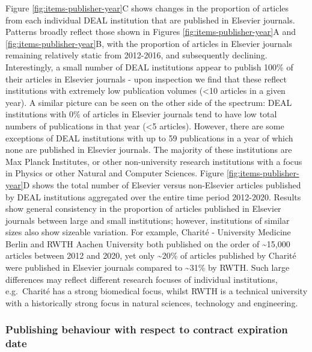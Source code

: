 \documentclass[
]{article}
\begin{document}
Figure \ref{fig:items-publisher-year}C shows changes in the proportion of articles from each individual DEAL institution that are published in Elsevier journals. Patterns broadly reflect those shown in Figures \ref{fig:items-publisher-year}A and \ref{fig:items-publisher-year}B, with the proportion of articles in Elsevier journals remaining relatively static from 2012-2016, and subsequently declining. Interestingly, a small number of DEAL institutions appear to publish 100\% of their articles in Elsevier journals - upon inspection we find that these reflect institutions with extremely low publication volumes (\textless10 articles in a given year). A similar picture can be seen on the other side of the spectrum: DEAL institutions with 0\% of articles in Elsevier journals tend to have low total numbers of publications in that year (\textless5 articles). However, there are some exceptions of DEAL institutions with up to 59 publications in a year of which none are published in Elsevier journals. The majority of these institutions are Max Planck Institutes, or other non-university research institutions with a focus in Physics or other Natural and Computer Sciences. Figure \ref{fig:items-publisher-year}D shows the total number of Elsevier versus non-Elsevier articles published by DEAL institutions aggregated over the entire time period 2012-2020. Results show general consistency in the proportion of articles published in Elsevier journals between large and small institutions; however, institutions of similar sizes also show sizeable variation. For example, Charité - University Medicine Berlin and RWTH Aachen University both published on the order of \textasciitilde15,000 articles between 2012 and 2020, yet only \textasciitilde20\% of articles published by Charité were published in Elsevier journals compared to \textasciitilde31\% by RWTH. Such large differences may reflect different research focuses of individual institutions, e.g.~Charité has a strong biomedical focus, whilst RWTH is a technical university with a historically strong focus in natural sciences, technology and engineering.

\hypertarget{publishing-behaviour-with-respect-to-contract-expiration-date}{%
\subsubsection{Publishing behaviour with respect to contract expiration date}\label{publishing-behaviour-with-respect-to-contract-expiration-date}}
\end{document}
